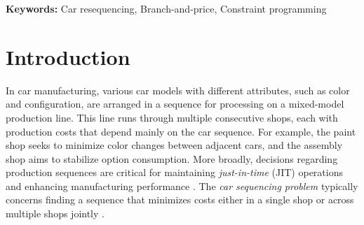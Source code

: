 \documentclass[12pt]{article}
\begin{document}
\noindent\textbf{Keywords:} Car resequencing, Branch-and-price, Constraint programming

\section{Introduction}\label{sec1}
In car manufacturing, various car models with different attributes, such as color and configuration, are arranged in a sequence for processing on a mixed-model production line. This line runs through multiple consecutive shops, each with production costs that depend mainly on the car sequence. For example, the paint shop seeks to minimize color changes between adjacent cars, and the assembly shop aims to stabilize option consumption. More broadly, decisions regarding production sequences are critical for maintaining \textit{just-in-time} (JIT) operations and enhancing manufacturing performance \citep{kubiak2008just, bray2015production}. The \textit{car sequencing problem} typically concerns finding a sequence that minimizes costs either in a single shop or across multiple shops jointly \citep{boysen2009sequencing}.



\end{document}
